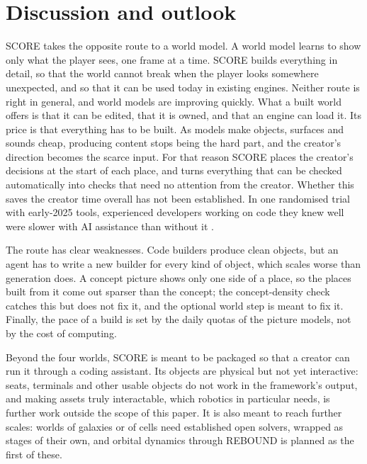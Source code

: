\section{Discussion and outlook}\label{discussion-and-outlook}

SCORE takes the opposite route to a world model. A world model learns to show only what the player sees, one frame at a time. SCORE builds everything in detail, so that the world cannot break when the player looks somewhere unexpected, and so that it can be used today in existing engines. Neither route is right in general, and world models are improving quickly. What a built world offers is that it can be edited, that it is owned, and that an engine can load it. Its price is that everything has to be built. As models make objects, surfaces and sounds cheap, producing content stops being the hard part, and the creator's direction becomes the scarce input. For that reason SCORE places the creator's decisions at the start of each place, and turns everything that can be checked automatically into checks that need no attention from the creator. Whether this saves the creator time overall has not been established. In one randomised trial with early-2025 tools, experienced developers working on code they knew well were slower with AI assistance than without it \citep{becker2025metr}.

The route has clear weaknesses. Code builders produce clean objects, but an agent has to write a new builder for every kind of object, which scales worse than generation does. A concept picture shows only one side of a place, so the places built from it come out sparser than the concept; the concept-density check catches this but does not fix it, and the optional world step is meant to fix it. Finally, the pace of a build is set by the daily quotas of the picture models, not by the cost of computing.

Beyond the four worlds, SCORE is meant to be packaged so that a creator can run it through a coding assistant. Its objects are physical but not yet interactive: seats, terminals and other usable objects do not work in the framework's output, and making assets truly interactable, which robotics in particular needs, is further work outside the scope of this paper. It is also meant to reach further scales: worlds of galaxies or of cells need established open solvers, wrapped as stages of their own, and orbital dynamics through REBOUND \citep{rein2012rebound} is planned as the first of these.
